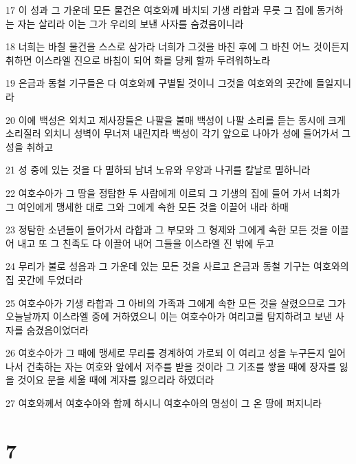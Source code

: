 \par 17 이 성과 그 가운데 모든 물건은 여호와께 바치되 기생 라합과 무릇 그 집에 동거하는 자는 살리라 이는 그가 우리의 보낸 사자를 숨겼음이니라
\par 18 너희는 바칠 물건을 스스로 삼가라 너희가 그것을 바친 후에 그 바친 어느 것이든지 취하면 이스라엘 진으로 바침이 되어 화를 당케 할까 두려워하노라
\par 19 은금과 동철 기구들은 다 여호와께 구별될 것이니 그것을 여호와의 곳간에 들일지니라
\par 20 이에 백성은 외치고 제사장들은 나팔을 불매 백성이 나팔 소리를 듣는 동시에 크게 소리질러 외치니 성벽이 무너져 내린지라 백성이 각기 앞으로 나아가 성에 들어가서 그 성을 취하고
\par 21 성 중에 있는 것을 다 멸하되 남녀 노유와 우양과 나귀를 칼날로 멸하니라
\par 22 여호수아가 그 땅을 정탐한 두 사람에게 이르되 그 기생의 집에 들어 가서 너희가 그 여인에게 맹세한 대로 그와 그에게 속한 모든 것을 이끌어 내라 하매
\par 23 정탐한 소년들이 들어가서 라합과 그 부모와 그 형제와 그에게 속한 모든 것을 이끌어 내고 또 그 친족도 다 이끌어 내어 그들을 이스라엘 진 밖에 두고
\par 24 무리가 불로 성읍과 그 가운데 있는 모든 것을 사르고 은금과 동철 기구는 여호와의 집 곳간에 두었더라
\par 25 여호수아가 기생 라합과 그 아비의 가족과 그에게 속한 모든 것을 살렸으므로 그가 오늘날까지 이스라엘 중에 거하였으니 이는 여호수아가 여리고를 탐지하려고 보낸 사자를 숨겼음이었더라
\par 26 여호수아가 그 때에 맹세로 무리를 경계하여 가로되 이 여리고 성을 누구든지 일어나서 건축하는 자는 여호와 앞에서 저주를 받을 것이라 그 기초를 쌓을 때에 장자를 잃을 것이요 문을 세울 때에 계자를 잃으리라 하였더라
\par 27 여호와께서 여호수아와 함께 하시니 여호수아의 명성이 그 온 땅에 퍼지니라

\chapter{7}

